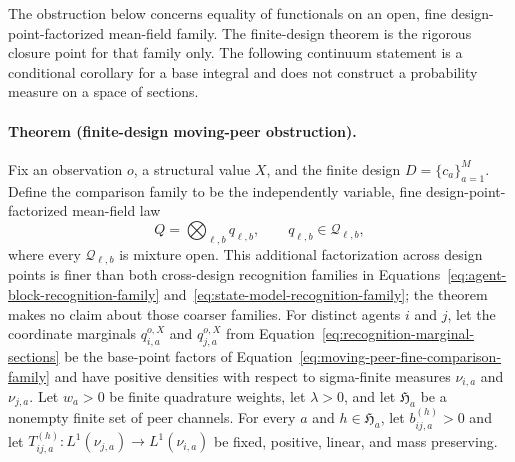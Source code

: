 The obstruction below concerns equality of functionals on an open, fine design-point-factorized mean-field family. The finite-design theorem is the rigorous closure point for that family only. The following continuum statement is a conditional corollary for a base integral and does not construct a probability measure on a space of sections.

\paragraph{Theorem (finite-design moving-peer obstruction).}
\label{thm:magent-moving-peer-obstruction}
Fix an observation \(o\), a structural value \(X\), and the finite design \(D=\{c_a\}_{a=1}^{M}\). Define the comparison family to be the independently variable, fine design-point-factorized mean-field law
\begin{equation}
Q=\bigotimes_{\ell,b}q_{\ell,b},
\qquad
q_{\ell,b}\in\mathcal Q_{\ell,b},
\label{eq:moving-peer-fine-comparison-family}
\end{equation}
where every \(\mathcal Q_{\ell,b}\) is mixture open. This additional factorization across design points is finer than both cross-design recognition families in Equations~\eqref{eq:agent-block-recognition-family} and~\eqref{eq:state-model-recognition-family}; the theorem makes no claim about those coarser families. For distinct agents \(i\) and \(j\), let the coordinate marginals \(q_{i,a}^{o,X}\) and \(q_{j,a}^{o,X}\) from Equation~\eqref{eq:recognition-marginal-sections} be the base-point factors of Equation~\eqref{eq:moving-peer-fine-comparison-family} and have positive densities with respect to sigma-finite measures \(\nu_{i,a}\) and \(\nu_{j,a}\). Let \(w_a>0\) be finite quadrature weights, let \(\lambda>0\), and let \(\mathfrak H_a\) be a nonempty finite set of peer channels. For every \(a\) and \(h\in\mathfrak H_a\), let \(b_{ij,a}^{(h)}>0\) and let
\(T_{ij,a}^{(h)}:L^1(\nu_{j,a})\to L^1(\nu_{i,a})\) be fixed, positive, linear, and mass preserving.

